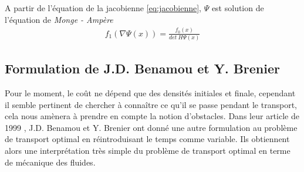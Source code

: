 \documentclass[a4paper,12pt]{article}
\begin{document}




A partir de l'équation de la jacobienne \eqref{eq:jacobienne}, $\Psi$ est solution de l'équation de \emph{Monge - Ampère} 
\begin{align}
f_1(\nabla\Psi(x)) = \frac{f_0(x)}{det\ H\Psi(x)}
\label{eq:mongemapere}
\end{align}


\subsection{Formulation de J.D. Benamou et Y. Brenier}
Pour le moment, le coût ne dépend que des densités initiales et finale, cependant il semble pertinent de chercher à connaître ce qu'il se passe pendant le transport, cela nous amènera à prendre en compte la notion d'obstacles. 
Dans leur article de 1999 \cite{benamoubrenier}, J.D. Benamou et Y. Brenier ont donné une autre formulation au problème de transport optimal en réintroduisant le temps comme variable. Ils obtiennent alors une interprétation très simple du problème de transport optimal en terme de mécanique des fluides. 
\end{document}
